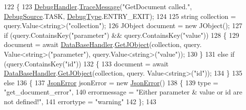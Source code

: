 \begin{DoxyCode}
122         \{
123             \mbox{\hyperlink{class_little_weeb_library_1_1_handlers_1_1_debug_handler}{DebugHandler}}.\mbox{\hyperlink{class_little_weeb_library_1_1_handlers_1_1_debug_handler_afccb37dfd6b2114af72000c2f4fe4607}{TraceMessage}}(\textcolor{stringliteral}{"GetDocument called."}, 
      \mbox{\hyperlink{namespace_little_weeb_library_1_1_handlers_a2a6ca0775121c9c503d58aa254d292be}{DebugSource}}.TASK, \mbox{\hyperlink{namespace_little_weeb_library_1_1_handlers_ab66019ed40462876ec4e61bb3ccb0a62}{DebugType}}.ENTRY\_EXIT);
124 
125             \textcolor{keywordtype}{string} collection = query.Value<\textcolor{keywordtype}{string}>(\textcolor{stringliteral}{"collection"});
126             JObject document = \textcolor{keyword}{new} JObject();
127             \textcolor{keywordflow}{if} (query.ContainsKey(\textcolor{stringliteral}{"parameter"}) && query.ContainsKey(\textcolor{stringliteral}{"value"}))
128             \{
129                 document = await \mbox{\hyperlink{class_little_weeb_library_1_1_handlers_1_1_data_base_handler}{DataBaseHandler}}.\mbox{\hyperlink{class_little_weeb_library_1_1_handlers_1_1_data_base_handler_a7f61583807f99b7838a33d2db0f7ca68}{GetJObject}}(collection, query.
      Value<\textcolor{keywordtype}{string}>(\textcolor{stringliteral}{"parameter"}), query.Value<\textcolor{keywordtype}{string}>(\textcolor{stringliteral}{"value"}));
130             \}
131             \textcolor{keywordflow}{else} \textcolor{keywordflow}{if} (query.ContainsKey(\textcolor{stringliteral}{"id"}))
132             \{
133                 document = await \mbox{\hyperlink{class_little_weeb_library_1_1_handlers_1_1_data_base_handler}{DataBaseHandler}}.\mbox{\hyperlink{class_little_weeb_library_1_1_handlers_1_1_data_base_handler_a7f61583807f99b7838a33d2db0f7ca68}{GetJObject}}(collection, query.
      Value<\textcolor{keywordtype}{string}>(\textcolor{stringliteral}{"id"}));
134             \}
135             \textcolor{keywordflow}{else}
136             \{
137                 \mbox{\hyperlink{class_little_weeb_library_1_1_models_1_1_json_error}{JsonError}} jsonError = \textcolor{keyword}{new} \mbox{\hyperlink{class_little_weeb_library_1_1_models_1_1_json_error}{JsonError}}()
138                 \{
139                     type = \textcolor{stringliteral}{"get\_document\_error"},
140                     errormessage = \textcolor{stringliteral}{"Either parameter & value or id are not defined!"},
141                     errortype = \textcolor{stringliteral}{"warning"}
142                 \};
143 

\end{DoxyCode}

